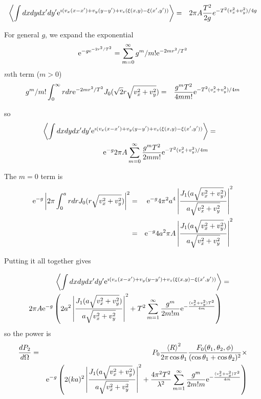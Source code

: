 \documentclass[11pt]{article}
\newcommand{\der}[2]{\frac{d {#1}}{d {#2}}}
\newcommand{\e}{{\rm e}}
\begin{document}
{{{{ \begin{eqnarray}
\left<\int dx dydx'dy'\e^{\imath( v_{x}(x-x')+v_{y}(y-y')+v_{z}(\xi(x,y)-\xi(x',y'))}\right>&=&
2\pi A\frac{T^{2}}{2g}e^{-T^{2}(v_{x}^{2}+v_{y}^{2})/4g}\end{eqnarray}

For general $g$, we expand the exponential
$$\e^{-g\e^{-2r^{2}/T^{2}}}=\sum_{m=0}^{\infty}g^{m}/m!\e^{-2mr^{2}/T^{2}}$$
$m$th term ($m > 0$)
\begin{eqnarray}
g^{m}/m!\int_{0}^{\infty} r dr\e^{-2mr^{2}/T^{2}} J_{0}(\sqrt{2}r\sqrt{v_{x}^{2}+v_{y}^{2}})&=&
\frac{g^{m}T^{2}}{4mm!}\e^{-T^{2}(v_{x}^{2}+v_{y}^{2})/4m}
\end{eqnarray}

so
 \begin{eqnarray}
\left<\int dx dydx'dy'\e^{\imath( v_{x}(x-x')+v_{y}(y-y')+v_{z}(\xi(x,y)-\xi(x',y'))}\right>&=&\\
\e^{-g}2\pi A\sum_{m=0}^{\infty}\frac{g^{m}T^{2}}{2mm!}\e^{-T^{2}(v_{x}^{2}+v_{y}^{2})/4m}\end{eqnarray}


The $m=0$  term is
\begin{eqnarray}
\e^{-g} \left|2\pi\int_{0}^{a}r dr J_{0}(r\sqrt{v_{x}^{2}+v_{y}^{2}})\right|^{2}&=&\e^{-g}4\pi^{2}a^{4}\left|\frac{J_{1}(a\sqrt{v_{x}^{2}+v_{y}^{2}})}{a\sqrt{v_{x}^{2}+v_{y}^{2}}}\right|^{2}\\
&=&\e^{-g}4a^{2}\pi A\left|\frac{J_{1}(a\sqrt{v_{x}^{2}+v_{y}^{2}})}{a\sqrt{v_{x}^{2}+v_{y}^{2}}}\right|^{2}\end{eqnarray}

Putting it all together gives

\begin{eqnarray}
\left<\int dx dydx'dy'\e^{\imath( v_{x}(x-x')+v_{y}(y-y')+v_{z}(\xi(x,y)-\xi(x',y'))}\right>&=&\\
2\pi A\e^{-g}\left(2a^{2}\left|\frac{J_{1}(a\sqrt{v_{x}^{2}+v_{y}^{2}})}{a\sqrt{v_{x}^{2}+v_{y}^{2}}}\right|^{2}+T^{2}\sum_{m=1}^{\infty}\frac{g^{m}}{2m!m}\e^{-\frac{(v_{x}^{2}+v_{y}^{2})T^{2}}{4m}}\right)\end{eqnarray}
so the power is
\begin{eqnarray}
\der{P_{2}}{\Omega}&=&P_{0}\frac{\left<R\right>^{2}}{2\pi\cos\theta_{1}}\frac{F_{0}(\theta_{1},\theta_{2},\phi)}{(\cos{\theta_{1}}+\cos{\theta_{2}})^{2}}\times\\
&&\e^{-g}\left(2(ka)^{2}\left|\frac{J_{1}(a\sqrt{v_{x}^{2}+v_{y}^{2}})}{a\sqrt{v_{x}^{2}+v_{y}^{2}}}\right|^{2}+\frac{4\pi^{2}T^{2}}{\lambda^{2}}\sum_{m=1}^{\infty}\frac{g^{m}}{2m!m}\e^{-\frac{(v_{x}^{2}+v_{y}^{2})T^{2}}{4m}}\right)\end{eqnarray}

}}}}
\end{document}
